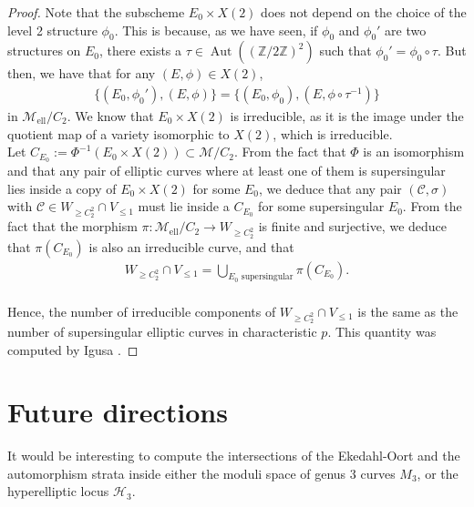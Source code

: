 \documentclass{amsart}
\newcommand{\calC}{\mathcal{C}}
\newcommand{\calH}{\mathcal{H}}
\DeclareMathOperator{\Aut}{Aut}
\newcommand{\mells}{\mathcal{M}_{\text{ell}}/C_2}
\newcommand{\mquot}{\mathcal{M}/C_2}
\numberwithin{equation}{section}
\theoremstyle{definition}
\theoremstyle{remark}
\begin{document}
\begin{proof}
Note that the subscheme $E_0\times X(2)$ does not depend on the choice of the level 2 structure $\phi_0$. This is because, as we have seen, if $\phi_0$ and $\phi_0'$ are two structures on $E_0$, there exists a $\tau\in \Aut((\mathbb{Z}/2\mathbb{Z})^2)$ such that $\phi_0'=\phi_0\circ\tau$. But then, we have that for any $(E,\phi)\in X(2)$,
\begin{align*}
\{(E_0,\phi_0'),(E,\phi)\}=\{(E_0,\phi_0),(E,\phi\circ\tau^{-1})\}
\end{align*}
in $\mells$. We know that $E_0\times X(2)$ is irreducible, as it is the image under the quotient map of a variety isomorphic to $X(2)$, which is irreducible.\\

Let $C_{E_0} :=\Phi^{-1}(E_0\times X(2))\subset \mquot$. From the fact that $\Phi$ is an isomorphism and that any pair of elliptic curves where at least one of them is supersingular lies inside a copy of $E_0\times X(2)$ for some $E_0$, we deduce that any pair $(\calC,\sigma)$ with $\calC\in W_{\geq C_2^2} \cap V_{\leq 1}$ must lie inside a $C_{E_0}$ for some supersingular $E_0$. From the fact that the morphism $\pi:\mells\rightarrow W_{\geq C_2^2}$ is finite and surjective, we deduce that $\pi(C_{E_0})$ is also an irreducible curve, and that
\begin{align*}
W_{\geq C_2^2} \cap V_{\leq 1}=\bigcup_{E_0\text{ supersingular}} \pi(C_{E_0}).\\
\end{align*}

Hence, the number of irreducible components of $W_{\geq C_2^2} \cap V_{\leq 1}$ is the same as the number of supersingular elliptic curves in characteristic $p$. This quantity was computed by Igusa \cite{Igusa1958ClassDiscriminant}.
\end{proof}
\vspace{10pt}
\section{Future directions}
It would be interesting to compute the intersections of the Ekedahl-Oort and the automorphism strata inside either the moduli space of genus $3$ curves $M_3$, or the hyperelliptic locus $\calH_3$.\\\newpage


\end{document}
